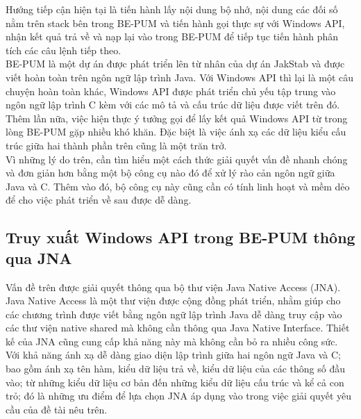Hướng tiếp cận hiện tại là tiến hành lấy nội dung bộ nhớ, nội dung các đối số nằm trên stack bên trong BE-PUM và tiến hành gọi thực sự với Windows API, nhận kết quả trả về và nạp lại vào trong BE-PUM để tiếp tục tiến hành phân tích các câu lệnh tiếp theo.\\

BE-PUM là một dự án được phát triển lên từ nhân của dự án JakStab và được viết hoàn toàn trên ngôn ngữ lập trình Java. Với Windows API thì lại là một câu chuyện hoàn toàn khác, Windows API được phát triển chủ yếu tập trung vào ngôn ngữ lập trình C kèm với các mô tả và cấu trúc dữ liệu được viết trên đó. Thêm lần nữa, việc hiện thực ý tưởng gọi để lấy kết quả Windows API từ trong lòng BE-PUM gặp nhiều khó khăn. Đặc biệt là việc ánh xạ các dữ liệu kiểu cấu trúc giữa hai thành phần trên cũng là một trăn trở.\\

Vì những lý do trên, cần tìm hiểu một cách thức giải quyết vấn đề nhanh chóng và đơn giản hơn bằng một bộ công cụ nào đó để xử lý rào cản ngôn ngữ giữa Java và C. Thêm vào đó, bộ công cụ này cũng cần có tính linh hoạt và mềm dẻo để cho việc phát triển về sau được dễ dàng.




	\subsection{Truy xuất Windows API trong BE-PUM thông qua JNA}

Vấn đề trên được giải quyết thông qua bộ thư viện Java Native Access (JNA).\\

Java Native Access là một thư viện được cộng đồng phát triển, nhằm giúp cho các chương trình được viết bằng ngôn ngữ lập trình Java dễ dàng truy cập vào các thư viện native shared mà không cần thông qua Java Native Interface. Thiết kế của JNA cũng cung cấp khả năng này mà không cần bỏ ra nhiều công sức.\\

Với khả năng ánh xạ dễ dàng giao diện lập trình giữa hai ngôn ngữ Java và C; bao gồm ánh xạ tên hàm, kiểu dữ liệu trả về, kiểu dữ liệu của các thông số đầu vào; từ những kiểu dữ liệu cơ bản đến những kiểu dữ liệu cấu trúc và kể cả con trỏ; đó là những ưu điểm để lựa chọn JNA áp dụng vào trong việc giải quyết yêu cầu của đề tài nêu trên.